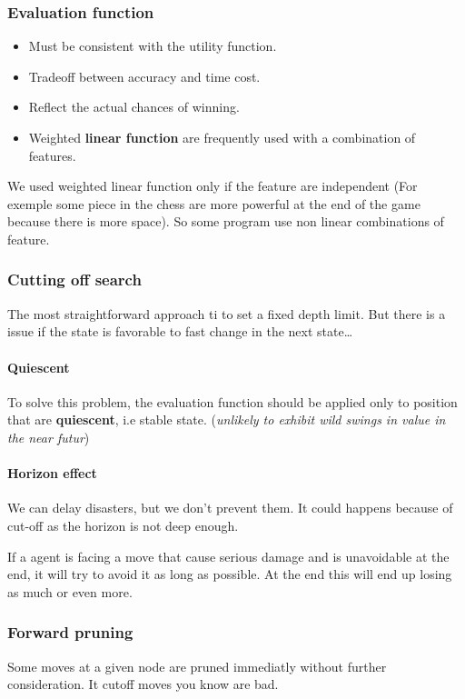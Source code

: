 \subsubsection{Evaluation function}
\begin{itemize}
    \item Must be consistent with the utility function.
    \item Tradeoff between accuracy and time cost.
    \item Reflect the actual chances of winning.
    \item Weighted \textbf{linear function} are frequently used with a combination of features.
\end{itemize}

We used weighted linear function only if the feature are independent (For exemple some piece in the chess
are more powerful at the end of the game because there is more space). So some program use non linear 
combinations of feature. 


\subsubsection{Cutting off search}
The most straightforward approach ti to set a fixed depth limit.
But there is a issue if the state is favorable to fast change in the next
state\ldots 

\paragraph{Quiescent}  To solve  this problem,  the evaluation  function
should  be applied  only to  position that  are \textbf{quiescent},  i.e
stable state. (\textit{unlikely  to exhibit wild swings in  value in the
near futur})

\paragraph{Horizon effect} We can delay disasters, but we don't prevent them. It could happens because of cut-off as the horizon is not deep enough.

If a agent is facing a move that cause serious damage and is unavoidable at the end, it will try to avoid it as long as possible. At the end this will end up losing as much or even more.

\subsubsection{Forward pruning}
Some moves at a given node are pruned immediatly without further consideration.
It cutoff moves you know are bad.

